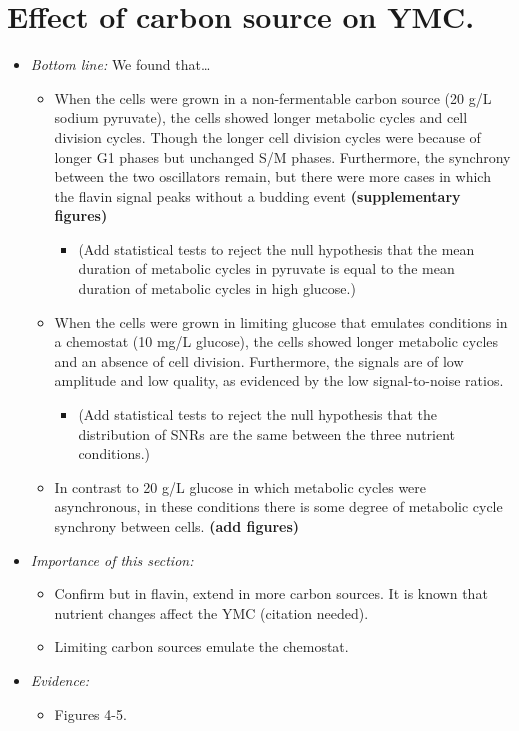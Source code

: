 \section{Effect of carbon source on YMC.}
\label{sec:biology-carbon}

\begin{itemize}
\item \emph{Bottom line:} We found that\ldots{}
\begin{itemize}
\item When the cells were grown in a non-fermentable carbon source (20 g/L sodium pyruvate), the cells showed longer metabolic cycles and cell division cycles.  Though the longer cell division cycles were because of longer G1 phases but unchanged S/M phases.  Furthermore, the synchrony between the two oscillators remain, but there were more cases in which the flavin signal peaks without a budding event \textbf{(supplementary figures)}
\begin{itemize}
\item (Add statistical tests to reject the null hypothesis that the mean duration of metabolic cycles in pyruvate is equal to the mean duration of metabolic cycles in high glucose.)
\end{itemize}
\item When the cells were grown in limiting glucose that emulates conditions in a chemostat (10 mg/L glucose), the cells showed longer metabolic cycles and an absence of cell division.  Furthermore, the signals are of low amplitude and low quality, as evidenced by the low signal-to-noise ratios.
\begin{itemize}
\item (Add statistical tests to reject the null hypothesis that the distribution of SNRs are the same between the three nutrient conditions.)
\end{itemize}
\item In contrast to 20 g/L glucose in which metabolic cycles were asynchronous, in these conditions there is some degree of metabolic cycle synchrony between cells. \textbf{(add figures)}
\end{itemize}
\item \emph{Importance of this section:}
\begin{itemize}
\item Confirm \cite{papagiannakisAutonomousMetabolicOscillations2017} but in flavin, extend in more carbon sources.  It is known that nutrient changes affect the YMC (citation needed).
\item Limiting carbon sources emulate the chemostat.
\end{itemize}
\item \emph{Evidence:}
\begin{itemize}
\item Figures 4-5.
\end{itemize}


\end{itemize}
